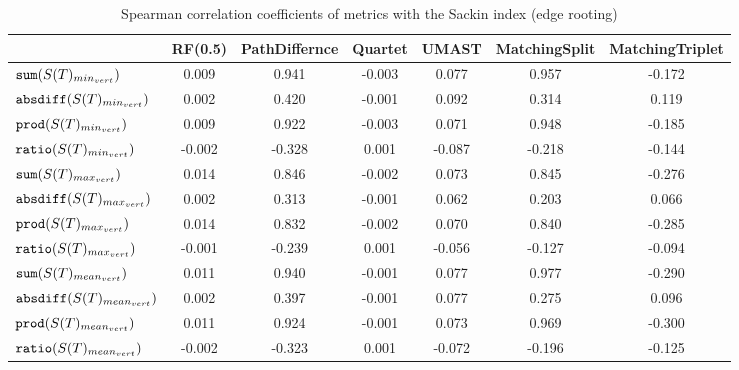 \begin{table}[h]
\centering
\caption{Spearman correlation coefficients of metrics with the Sackin index (edge rooting)}
\begin{tabular}{lcccccc}
 & RF(0.5) & PathDiffernce & Quartet & UMAST & MatchingSplit & MatchingTriplet \\
\hline
${\verb+sum+}(S(T)_{min_{vert}})$ & 0.009 & 0.941 & -0.003 & 0.077 & 0.957 & -0.172 \\
${\verb+absdiff+}(S(T)_{min_{vert}})$ & 0.002 & 0.420 & -0.001 & 0.092 & 0.314 & 0.119 \\
${\verb+prod+}(S(T)_{min_{vert}})$ & 0.009 & 0.922 & -0.003 & 0.071 & 0.948 & -0.185 \\
${\verb+ratio+}(S(T)_{min_{vert}})$ & -0.002 & -0.328 & 0.001 & -0.087 & -0.218 & -0.144 \\
${\verb+sum+}(S(T)_{max_{vert}})$ & 0.014 & 0.846 & -0.002 & 0.073 & 0.845 & -0.276 \\
${\verb+absdiff+}(S(T)_{max_{vert}})$ & 0.002 & 0.313 & -0.001 & 0.062 & 0.203 & 0.066 \\
${\verb+prod+}(S(T)_{max_{vert}})$ & 0.014 & 0.832 & -0.002 & 0.070 & 0.840 & -0.285 \\
${\verb+ratio+}(S(T)_{max_{vert}})$ & -0.001 & -0.239 & 0.001 & -0.056 & -0.127 & -0.094 \\
${\verb+sum+}(S(T)_{mean_{vert}})$ & 0.011 & 0.940 & -0.001 & 0.077 & 0.977 & -0.290 \\
${\verb+absdiff+}(S(T)_{mean_{vert}})$ & 0.002 & 0.397 & -0.001 & 0.077 & 0.275 & 0.096 \\
${\verb+prod+}(S(T)_{mean_{vert}})$ & 0.011 & 0.924 & -0.001 & 0.073 & 0.969 & -0.300 \\
${\verb+ratio+}(S(T)_{mean_{vert}})$ & -0.002 & -0.323 & 0.001 & -0.072 & -0.196 & -0.125 \\
\end{tabular}
\end{table}

